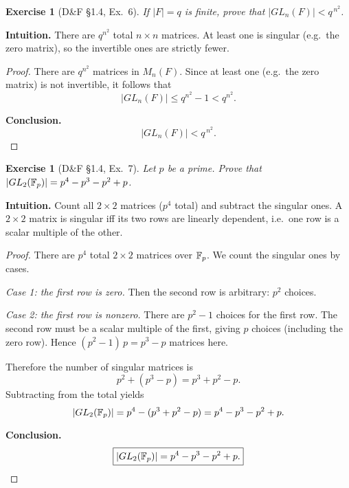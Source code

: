 \documentclass[12pt]{article}
\newtheorem{exercise}[theorem]{Exercise}
\theoremstyle{definition}
\begin{document}
\newpage

\begin{exercise}[D\&F §1.4, Ex.~6]
If $|F|=q$ is finite, prove that $|GL_n(F)|<q^{\,n^2}$.
\end{exercise}

\dotfill

\noindent\textbf{Intuition.}
There are $q^{n^2}$ total $n\times n$ matrices. At least one is singular (e.g.\ the zero matrix), so the invertible ones are strictly fewer.

\dotfill

\begin{proof}
There are $q^{n^2}$ matrices in $M_n(F)$. Since at least one (e.g.\ the zero matrix) is not invertible, it follows that
\[
|GL_n(F)|\le q^{n^2}-1<q^{n^2}.
\]
\smallskip

\noindent\textbf{Conclusion.}
\[
\boxed{|GL_n(F)|<q^{\,n^2}.}
\]
\end{proof}

\newpage

\begin{exercise}[D\&F §1.4, Ex.~7]
Let $p$ be a prime. Prove that $\lvert GL_2(\Bbb F_p)\rvert=p^4-p^3-p^2+p$.
\end{exercise}

\dotfill

\noindent\textbf{Intuition.}
Count all $2\times2$ matrices ($p^4$ total) and subtract the singular ones. A $2\times2$ matrix is singular
iff its two rows are linearly dependent, i.e.\ one row is a scalar multiple of the other.

\dotfill

\begin{proof}
There are $p^4$ total $2\times2$ matrices over $\Bbb F_p$. We count the singular ones by cases.

\emph{Case 1: the first row is zero.} Then the second row is arbitrary: $p^2$ choices.

\emph{Case 2: the first row is nonzero.} There are $p^2-1$ choices for the first row. The second row must be a scalar
multiple of the first, giving $p$ choices (including the zero row). Hence $(p^2-1)\,p=p^3-p$ matrices here.

Therefore the number of singular matrices is
\[
p^2+(p^3-p)=p^3+p^2-p.
\]
Subtracting from the total yields
\[
\lvert GL_2(\Bbb F_p)\rvert
= p^4-(p^3+p^2-p)
= p^4-p^3-p^2+p.
\]

\smallskip
\noindent\textbf{Conclusion.}
\[
\boxed{\lvert GL_2(\Bbb F_p)\rvert=p^4-p^3-p^2+p.}
\]
\end{proof}
\end{document}
